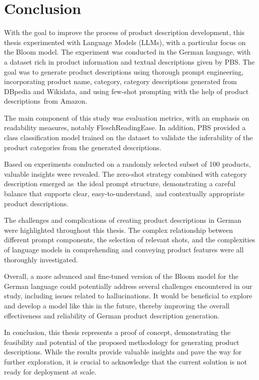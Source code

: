 \chapter{Conclusion}\label{chap:conclusion}

With the goal to improve the process of product description development, this thesis experimented with Language Models (LLMs), with a particular focus on the Bloom model. The experiment was conducted in the German language, with a dataset rich in product information and textual descriptions given by PBS. The goal was to generate product descriptions using thorough prompt engineering, incorporating product name, category, category descriptions generated from DBpedia and Wikidata, and using few-shot prompting with the help of product descriptions from Amazon.

The main component of this study was evaluation metrics, with an emphasis on readability measures, notably FleschReadingEase. In addition, PBS provided a class classification model trained on the dataset to validate the inferability of the product categories from the generated descriptions.

Based on experiments conducted on a randomly selected subset of 100 products, valuable insights were revealed. The zero-shot strategy combined with category description emerged as the ideal prompt structure, demonstrating a careful balance that supports clear, easy-to-understand, and contextually appropriate product descriptions.

The challenges and complications of creating product descriptions in German were highlighted throughout this thesis. The complex relationship between different prompt components, the selection of relevant shots, and the complexities of language models in comprehending and conveying product features were all thoroughly investigated.

Overall, a more advanced and fine-tuned version of the Bloom model for the German language could potentially address several challenges encountered in our study, including issues related to hallucinations. It would be beneficial to explore and develop a model like this in the future, thereby improving the overall effectiveness and reliability of German product description generation.

In conclusion, this thesis represents a proof of concept, demonstrating the feasibility and potential of the proposed methodology for generating product descriptions. While the results provide valuable insights and pave the way for further exploration, it is crucial to acknowledge that the current solution is not ready for deployment at scale. 